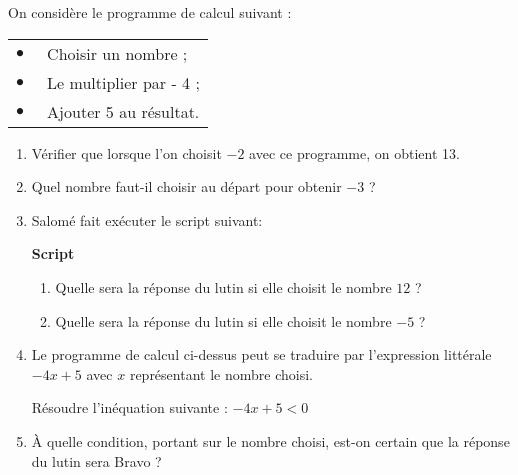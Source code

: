 
\medskip

On considère le programme de calcul suivant :

\begin{center}
\begin{tabularx}{0.4\linewidth}{|lX|}\hline
$\bullet~~$& Choisir un nombre ;\\
$\bullet~~$& Le multiplier par - 4 ;\\
$\bullet~~$& Ajouter 5 au résultat.\\ \hline
\end{tabularx}
\end{center}

\begin{enumerate}
\item Vérifier que lorsque l'on choisit $- 2$ avec ce programme, on obtient 13.
\item Quel nombre faut-il choisir au départ pour obtenir $- 3$ ?
\item Salomé fait exécuter le script suivant:

\begin{center}
\textbf{Script}

\begin{scratch}
{
}
{}
\end{scratch}

\end{center}

	\begin{enumerate}
		\item Quelle sera la réponse du lutin si elle choisit le nombre $12$ ?
		\item Quelle sera la réponse du lutin si elle choisit le nombre $- 5$ ?
 	\end{enumerate}
\item  Le programme de calcul ci-dessus peut se traduire par l'expression littérale
$- 4x + 5$ avec $x$ représentant le nombre choisi.

Résoudre l'inéquation suivante : $- 4x + 5 < 0$
\item  À quelle condition, portant sur le nombre choisi, est-on certain que la réponse
du lutin sera \og Bravo \fg{} ?
\end{enumerate}

\bigskip

